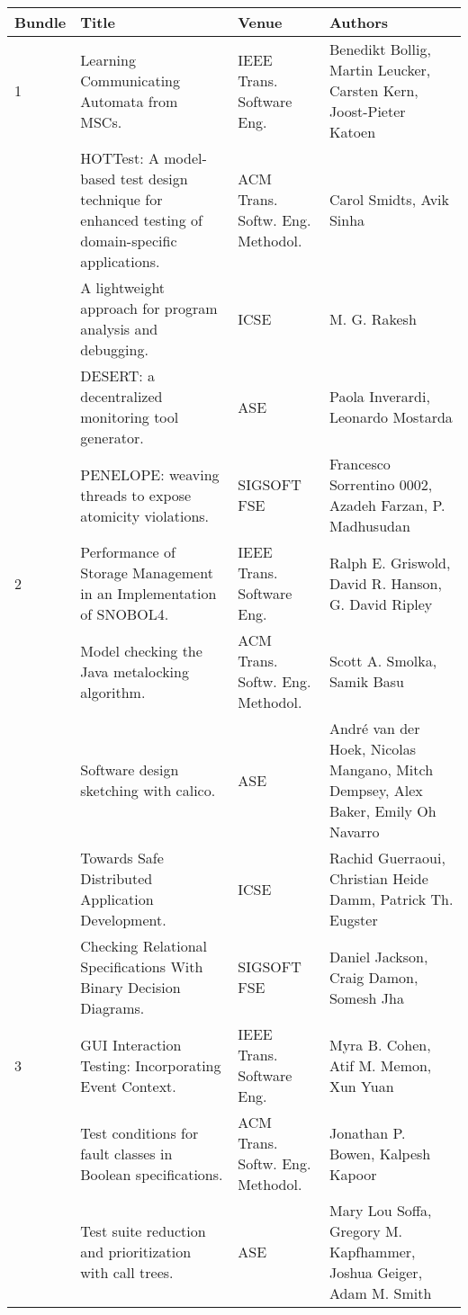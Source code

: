 \begin{center}
\begin{longtable}{|p{}p{}p{}p{}|}
    \hline
    Bundle & Title & Venue & Authors \\
    \hline
\rowcolor{black!20}    1	& Learning Communicating Automata from MSCs.& IEEE Trans. Software 
Eng.& Benedikt Bollig, Martin Leucker, Carsten Kern, Joost-Pieter Katoen \\
	& HOTTest: A model-based test design technique for enhanced testing of domain-specific 
applications.& ACM Trans. Softw. Eng. Methodol.& Carol Smidts, Avik Sinha \\
\rowcolor{black!20}	& A lightweight approach for program analysis and debugging.& ICSE& M. G. 
Rakesh \\
	& DESERT: a decentralized monitoring tool generator.& ASE& Paola Inverardi, Leonardo 
Mostarda \\
\rowcolor{black!20}	& PENELOPE: weaving threads to expose atomicity violations.& SIGSOFT FSE& 
Francesco Sorrentino 0002, Azadeh Farzan, P. Madhusudan \\
    2	& Performance of Storage Management in an Implementation of SNOBOL4.& IEEE Trans. Software 
Eng.& Ralph E. Griswold, David R. Hanson, G. David Ripley \\
\rowcolor{black!20}	& Model checking the Java metalocking algorithm.& ACM Trans. Softw. Eng. 
Methodol.& Scott A. Smolka, Samik Basu \\
	& Software design sketching with calico.& ASE& André van der Hoek, Nicolas Mangano, Mitch 
Dempsey, Alex Baker, Emily Oh Navarro \\
\rowcolor{black!20}	& Towards Safe Distributed Application Development.& ICSE& Rachid 
Guerraoui, 
Christian Heide Damm, Patrick Th. Eugster \\
	& Checking Relational Specifications With Binary Decision Diagrams.& SIGSOFT FSE& Daniel 
Jackson, Craig Damon, Somesh Jha \\
\rowcolor{black!20}    3	& GUI Interaction Testing: Incorporating Event Context.& IEEE 
Trans. 
Software Eng.& Myra B. Cohen, Atif M. Memon, Xun Yuan \\
	& Test conditions for fault classes in Boolean specifications.& ACM Trans. Softw. Eng. 
Methodol.& Jonathan P. Bowen, Kalpesh Kapoor \\
\rowcolor{black!20}	& Test suite reduction and prioritization with call trees.& ASE& Mary Lou 
Soffa, Gregory M. Kapfhammer, Joshua Geiger, Adam M. Smith \\

\end{longtable}
\end{center}
